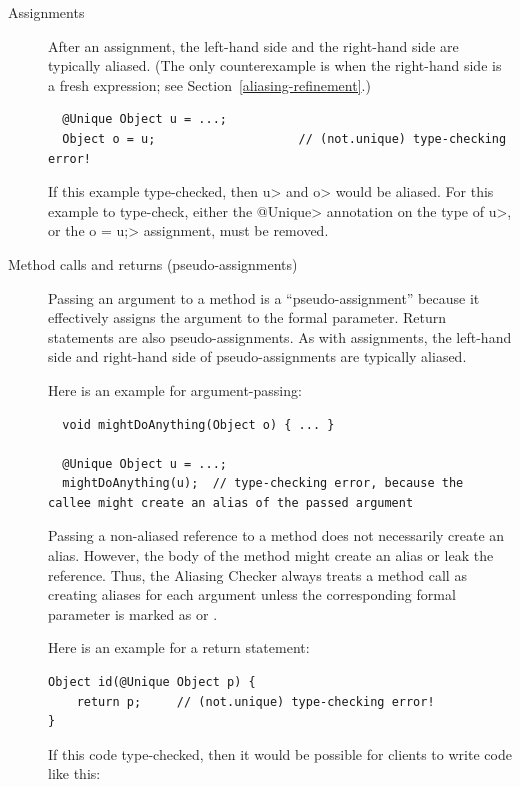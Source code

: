 \begin{description}
\item[Assignments]
After an assignment, the left-hand side and the right-hand side are
typically aliased.  (The only counterexample is when the right-hand side is
a fresh expression; see Section~\ref{aliasing-refinement}.)

\begin{Verbatim}
  @Unique Object u = ...;
  Object o = u;                    // (not.unique) type-checking error!
\end{Verbatim}

If this example type-checked, then \<u> and \<o> would be aliased.
For this example to type-check, either the \<@Unique> annotation on the
type of \<u>, or the \<o = u;> assignment, must be removed.

\item[Method calls and returns (pseudo-assignments)]
Passing an argument to a method is a ``pseudo-assignment'' because it effectively
assigns the argument to the formal parameter.  Return statements are also
pseudo-assignments.
As with assignments, the left-hand side and right-hand side of
pseudo-assignments are typically aliased.

Here is an example for argument-passing:

\begin{Verbatim}
  void mightDoAnything(Object o) { ... }

  @Unique Object u = ...;
  mightDoAnything(u);  // type-checking error, because the callee might create an alias of the passed argument
\end{Verbatim}

Passing a non-aliased
reference to a method does not necessarily create an alias.
However, the body of the method might create an alias or leak the
reference.  Thus, the Aliasing Checker always treats a method call as
creating aliases for each argument unless the corresponding formal
parameter is marked as
 or
.

Here is an example for a return statement:

\begin{Verbatim}
Object id(@Unique Object p) {
    return p;     // (not.unique) type-checking error!
}
\end{Verbatim}

If this code type-checked, then it would be possible for clients to write
code like this:


\end{description}
